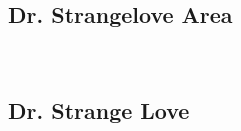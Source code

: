 \begin{multicols}{2}
\begin{minipage}{\columnwidth}
			\end{minipage}
			
\newpage
		\section{Dr. Strangelove Area}\label{sa:Dr. Strangelove Area}
	\begin{minipage}{\columnwidth}
	\
	\end{minipage}
	
			\begin{minipage}{\columnwidth}
			\subsection*{Dr. Strange Love}\label{bf:Dr. Strange Love}
			\
			
			\end{minipage}
			
\end{multicols}
\clearpage